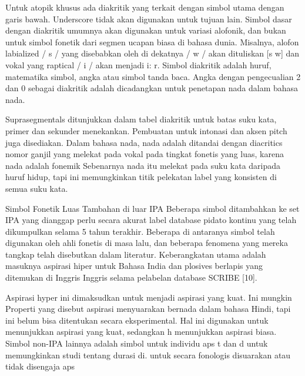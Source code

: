 	Untuk atopik khusus ada diakritik yang terkait dengan simbol utama dengan garis bawah.
	Underscore tidak akan digunakan untuk tujuan lain. Simbol dasar dengan diakritik umumnya akan digunakan untuk variasi alofonik, dan bukan untuk simbol fonetik dari segmen ucapan biasa di bahasa dunia. Misalnya, alofon labialized / s / yang disebabkan oleh di dekatnya / w / akan dituliskan [s w] dan vokal yang raptical / i / akan menjadi i: r. Simbol diakritik adalah huruf, matematika simbol, angka atau simbol tanda baca. Angka dengan pengecualian 2 dan 0 sebagai diakritik adalah dicadangkan untuk penetapan nada dalam bahasa nada.

	Suprasegmentals ditunjukkan dalam tabel diakritik untuk batas suku kata, primer dan sekunder
    menekankan. Pembuatan untuk intonasi dan aksen pitch juga disediakan. Dalam bahasa nada, nada adalah
    ditandai dengan diacritics nomor ganjil yang melekat pada vokal pada tingkat fonetis yang luas, karena nada
    adalah fonemik Sebenarnya nada itu melekat pada suku kata daripada huruf hidup, tapi ini
    memungkinkan titik pelekatan label yang konsisten di semua suku kata.

	Simbol Fonetik Luas Tambahan di luar IPA 
	Beberapa simbol ditambahkan ke set IPA yang dianggap perlu secara akurat
	label database pidato kontinu yang telah dikumpulkan selama 5 tahun terakhir. Beberapa di antaranya
	simbol telah digunakan oleh ahli fonetis di masa lalu, dan beberapa fenomena yang mereka tangkap
	telah disebutkan dalam literatur. Keberangkatan utama adalah masuknya aspirasi hiper untuk
	Bahasa India dan plosives berlapis yang ditemukan di Inggris Inggris selama pelabelan
	database SCRIBE [10]. 

    Aspirasi hyper ini dimaksudkan untuk menjadi aspirasi yang kuat. Ini mungkin
	Properti yang disebut aspirasi menyuarakan bernada dalam bahasa Hindi, tapi ini belum bisa ditentukan secara eksperimental.
	Hal ini digunakan untuk menunjukkan aspirasi yang kuat, sedangkan h menunjukkan aspirasi biasa. Simbol non-IPA lainnya
	adalah simbol untuk individu
	aps t dan d untuk memungkinkan studi tentang durasi di. untuk
	secara fonologis disuarakan atau tidak disengaja
	aps
